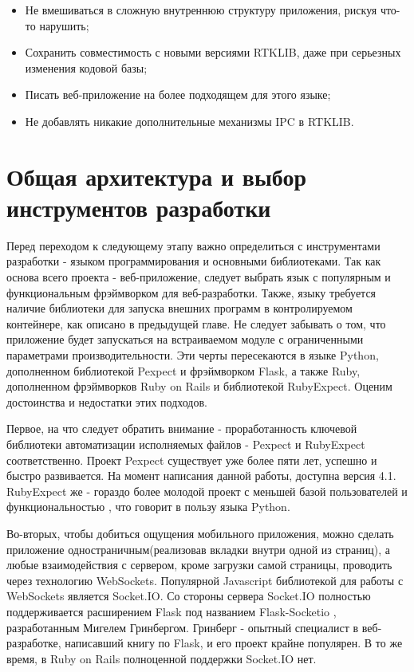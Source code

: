 \begin{itemize}
  \item Не вмешиваться в сложную внутреннюю структуру приложения, рискуя что-то нарушить;
  \item Сохранить совместимость с новыми версиями RTKLIB, даже при серьезных изменения кодовой базы;
  \item Писать веб-приложение на более подходящем для этого языке;
  \item Не добавлять никакие дополнительные механизмы IPC в RTKLIB.
\end{itemize}


\section{Общая архитектура и выбор инструментов разработки} \label{sect2_4}

Перед переходом к следующему этапу важно определиться с инструментами разработки - языком программирования и основными библиотеками. Так как основа всего проекта - веб-приложение, следует выбрать язык с популярным и функциональным фрэймворком для веб-разработки. Также, языку требуется наличие библиотеки для запуска внешних программ в контролируемом контейнере, как описано в предыдущей главе. Не следует забывать о том, что приложение будет запускаться на встраиваемом модуле с ограниченными параметрами производительности. Эти черты пересекаются в языке Python, дополненном библиотекой Pexpect и фрэймворком Flask, а также Ruby, дополненном фрэймворков Ruby on Rails и библиотекой RubyExpect. Оценим достоинства и недостатки этих подходов.

Первое, на что следует обратить внимание - проработанность ключевой библиотеки автоматизации исполняемых файлов - Pexpect и RubyExpect соответственно. Проект Pexpect \cite{pexpect-docs} существует уже более пяти лет, успешно и быстро развивается. На момент написания данной работы, доступна версия 4.1. RubyExpect же - гораздо более молодой проект с меньшей базой пользователей и функциональностью \cite{rubyexpect-docs}, что говорит в пользу языка Python.

Во-вторых, чтобы добиться ощущения мобильного приложения, можно сделать приложение одностраничным(реализовав вкладки внутри одной из страниц), а любые взаимодействия с сервером, кроме загрузки самой страницы, проводить через технологию WebSockets. Популярной Javascript библиотекой для работы с WebSockets является Socket.IO. Со стороны сервера Socket.IO полностью поддерживается расширением Flask под названием Flask-Socketio \cite{flask-socketio-docs}, разработанным Мигелем Гринбергом. Гринберг - опытный специалист в веб-разработке, написавший книгу по Flask, и его проект крайне популярен. В то же время, в Ruby on Rails полноценной поддержки Socket.IO нет.


